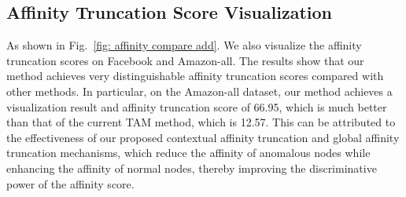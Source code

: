\begin{appendix}
\subsection{Affinity Truncation Score Visualization}
As shown in Fig.~\ref{fig: affinity compare add}. We also visualize the affinity truncation scores on Facebook and Amazon-all. The results show that our method achieves very distinguishable affinity truncation scores compared with other methods. In particular, on the Amazon-all dataset, our method achieves a visualization result and affinity truncation score of 66.95, which is much better than that of the current TAM method, which is 12.57.
This can be attributed to the effectiveness of our proposed contextual affinity truncation and global affinity truncation mechanisms, which reduce the affinity of anomalous nodes while enhancing the affinity of normal nodes, thereby improving the discriminative power of the affinity score.

























\end{appendix}
